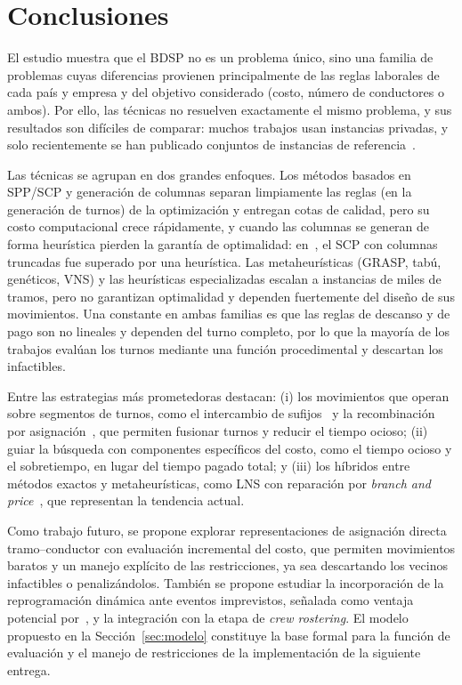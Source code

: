 \documentclass[letter, 10pt]{article}
\begin{document}
\section{Conclusiones}\label{sec:conc}
El estudio muestra que el BDSP no es un problema único, sino una familia de problemas cuyas diferencias provienen principalmente de las reglas laborales de cada país y empresa y del objetivo considerado (costo, número de conductores o ambos). Por ello, las técnicas no resuelven exactamente el mismo problema, y sus resultados son difíciles de comparar: muchos trabajos usan instancias privadas, y solo recientemente se han publicado conjuntos de instancias de referencia~\cite{Constantino2017,Kletzander2020}.

Las técnicas se agrupan en dos grandes enfoques. Los métodos basados en SPP/SCP y generación de columnas separan limpiamente las reglas (en la generación de turnos) de la optimización y entregan cotas de calidad, pero su costo computacional crece rápidamente, y cuando las columnas se generan de forma heurística pierden la garantía de optimalidad: en~\cite{Constantino2017}, el SCP con columnas truncadas fue superado por una heurística. Las metaheurísticas (GRASP, tabú, genéticos, VNS) y las heurísticas especializadas escalan a instancias de miles de tramos, pero no garantizan optimalidad y dependen fuertemente del diseño de sus movimientos. Una constante en ambas familias es que las reglas de descanso y de pago son no lineales y dependen del turno completo, por lo que la mayoría de los trabajos evalúan los turnos mediante una función procedimental y descartan los infactibles.

Entre las estrategias más prometedoras destacan: (i) los movimientos que operan sobre segmentos de turnos, como el intercambio de sufijos~\cite{DeLeone2011a} y la recombinación por asignación~\cite{Constantino2017}, que permiten fusionar turnos y reducir el tiempo ocioso; (ii) guiar la búsqueda con componentes específicos del costo, como el tiempo ocioso y el sobretiempo, en lugar del tiempo pagado total; y (iii) los híbridos entre métodos exactos y metaheurísticas, como LNS con reparación por \emph{branch and price}~\cite{Kletzander2026}, que representan la tendencia actual.

Como trabajo futuro, se propone explorar representaciones de asignación directa tramo--conductor con evaluación incremental del costo, que permiten movimientos baratos y un manejo explícito de las restricciones, ya sea descartando los vecinos infactibles o penalizándolos. También se propone estudiar la incorporación de la reprogramación dinámica ante eventos imprevistos, señalada como ventaja potencial por~\cite{Constantino2017}, y la integración con la etapa de \emph{crew rostering}. El modelo propuesto en la Sección~\ref{sec:modelo} constituye la base formal para la función de evaluación y el manejo de restricciones de la implementación de la siguiente entrega.
\end{document}
